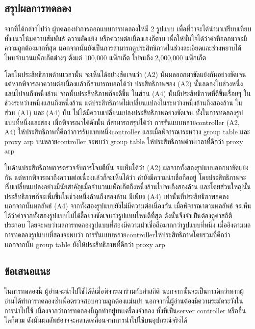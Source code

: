 \subsection{สรุปผลการทดลอง}

จากที่ได้กล่าวไปว่า ผู้ทดลองทำการออกแบบการทดลองให้มี 2 รูปแบบ เพื่อที่ว่าจะได้นำมาเปรียบเทียบ
ทั้งแนวโน้มความสัมพันธ์ ความขัดแย้ง หรือความต่อเนื่องเองก็ตาม เพื่อให้มั่นใจได้ว่าค่าที่ออกมาจะมีความถูกต้องมากที่สุด
นอกจากนั้นยังเป็นการสามารถดูประสิทธิภาพในช่วงละเอียดและช่วงหยาบได้ไหนจำนวนแพ็กเก็ตต่างๆ ตั่งแต่ 100,000 แพ็กเก็ต ไปจนถึง 2,000,000 แพ็กเก็ต

โดยในประสิทธิภาพด้านเวลานั้น จะเห็นได้อย่างชัดเจนว่า (A2) นั้นผลออกมาขัดแย้งกันอย่างชัดเจน แต่หากพิจารณาความต่อเนื่องแล้วก็สามารถบอกได้ว่า
ประสิทธิภาพของ (A2) นั้นลดลงในช่วงหนึ่งแสนไปจนถึงหนึ่งล้าน
จากนั้นประสิทธิภาพก็จะดีขึ้น ในส่วน (A4) นั้นมีประสิทธิภาพที่ดีขึ้นเรื่อยๆ ในช่วงระหว่างหนึ่งแสนถึงหนึ่งล้าน แต่ประสิทธิภาพไม่เปลี่ยนแปลงในระหว่างหนึ่งล้านถึงสองล้าน
ในส่วน (A1) และ (A4) นั้น ไม่ได้มีความเปลี่ยนแปลงประสิทธิภาพอย่างชัดเจน ทั้งในการทดลองรูปแบบที่หนึ่งและสอง
เมื่อพิจารณาได้ดังนั้น ก็สามารถสรุปได้ว่า การรันแบบหลาย\gls{controller} (A2, A4) ให้ประสิทธิภาพที่ดีกว่าการรันแบบหนึ่ง\gls{controller}
และเมื่อพิจารณาระหว่าง group table และ proxy arp บนหลาย\gls{controller} จะพบว่า group table ให้ประสิทธิภาพด้านเวลาที่ดีกว่า proxy arp

ในด้านประสิทธิภาพการตรวจจับการโจมตีนั้น จะเห็นได้ว่า (A2) ผลจากทั้งสองรูปแบบออกมาขัดแย้งกัน แต่หากพิจารณาถึงความต่อเนื่องแล้วก็จะเห็นได้ว่า
ค่ายังมีความน่าเชื่อถืออยู่ โดยประสิทธิภาพจะเริ่มเปลี่ยนแปลงอย่างมีนัยสำคัญเมื่อจำนวนแพ็กเก็ตถึงหนึ่งล้านไปจนถึงสองล้าน
และโดยส่วนใหญ่นั้น ประสิทธิภาพก็จะเพิ่มขึ้นในช่วงหนึ่งล้านถึงสองล้าน มีเพียง (A4) เท่านั้นที่ประสิทธิภาพลดลง นอกจากนั้นผลลัพธ์ (A4) จากทั้งสองรูปแบบยังไม่มีความต่อเนื่องกัน
เมื่อพิจารณาตามผลลัพธ์ จะเห็นได้ว่าค่าจากทั้งสองรูปแบบไม่ได้ชี้อย่างชัดเจนว่ารูปแบบไหนดีที่สุด ดังนั้นจึงจำเป็นต้องดูค่าสถิติประกอบ
โดยจะพบว่าผลการทดลองรูปแบบที่สองมีความน่าเชื่อถือมากกว่ารูปแบบที่หนึ่ง เมื่ออิงตามผลการทดลองรูปแบบที่สองจะพบว่า
การรันแบบหลาย\gls{controller}ให้ประสิทธิภาพโดยรวมที่ดีกว่า นอกจากนั้น group table ยังให้ประสิทธิภาพที่ดีกว่า proxy arp 

\subsection{ข้อเสนอแนะ}

ในการทดลองนี้ ผู้อ่านจะนำไปใช้ได้ดีเมื่อพิจารณาร่วมกับค่าสถิติ นอกจากนั้นจะเป็นการดีกว่าหากผู้อ่านได้ทำการทดลองซ้ำเพื่อตรวจสอบความถูกต้องแม่นยำ
นอกจากนี้ผู้อ่านต้องมีความระมัดระวังในการนำไปใช้ เนื่องจากว่าการทดลองนี้ถูกทำอยู่บนเครื่องจำลอง ทั้งที่เป็น\gls{server} \gls{controller} หรืออื่นใดก็ตาม
ดังนั้นผลลัพธ์อาจจะคลาดเคลื่อนจากการนำไปใช้บนอุปกรณ์จริงได้